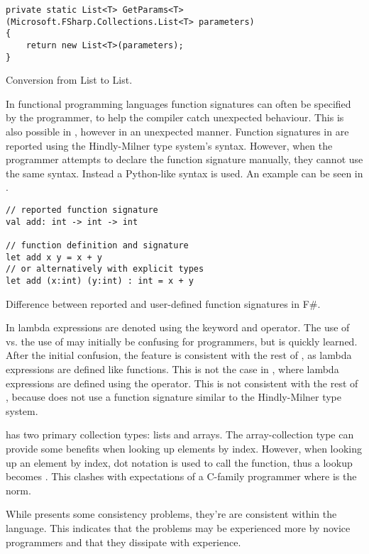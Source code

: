 \begin{listing}[H]
\begin{verbatim}
private static List<T> GetParams<T> (Microsoft.FSharp.Collections.List<T> parameters)
{
    return new List<T>(parameters);
}
\end{verbatim}
\caption{Conversion from \fs List to \cs List.}
\label{lst:list-conv}
\end{listing}

In functional programming languages function signatures can often be specified by the programmer, to help the compiler catch unexpected behaviour. This is also possible in \fs, however in an unexpected manner. Function signatures in \fs are reported using the Hindly-Milner type system's syntax\cite{fsharp:type:inference}. However, when the programmer attempts to declare the function signature manually, they cannot use the same syntax. Instead a Python-like syntax is used. An example can be seen in .

\begin{listing}[H]
\begin{verbatim}
// reported function signature
val add: int -> int -> int

// function definition and signature
let add x y = x + y
// or alternatively with explicit types
let add (x:int) (y:int) : int = x + y
\end{verbatim}
\caption{Difference between reported and user-defined function signatures in F\#.}
\label{lst:fun-sig}
\end{listing}

In \fs lambda expressions are denoted using the  keyword and \ttt{-\textgreater} operator. The use of  vs. the use of  may initially be confusing for programmers, but is quickly learned. After the initial confusion, the feature is consistent with the rest of \fs, as lambda expressions are defined like functions. This is not the case in \cs, where lambda expressions are defined using the \ttt{=\textgreater} operator. This is not consistent with the rest of \cs, because \cs does not use a function signature similar to the Hindly-Milner type system.

\fs has two primary collection types: lists and arrays. The array-collection type can provide some benefits when looking up elements by index.  However, when looking up an element by index, dot notation is used to call the \ttt{[]} function, thus a lookup becomes . This clashes with expectations of a C-family programmer where  is the norm.

While \fs presents some consistency problems, they're are consistent within the language. This indicates that the problems may be experienced more by novice programmers and that they dissipate with experience.
